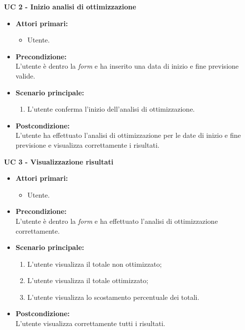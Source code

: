 \vspace{0.5cm}

\noindent \textbf{\large UC 2 - Inizio analisi di ottimizzazione}
\label{uc:inizio-analisi-ottimizzazione}
\begin{itemize}

	\item \textbf{Attori primari: }
		\begin{itemize}
			\item Utente.
		\end{itemize}

	\item \textbf{Precondizione: }\\[0.3cm]
		L'utente è dentro la \textit{form} e ha inserito una data di inizio e fine previsione valide.

	\item \textbf{Scenario principale: }
		\begin{enumerate}
			\item L'utente conferma l'inizio dell'analisi di ottimizzazione.
		\end{enumerate}
		

	\item \textbf{Postcondizione: }\\[0.3cm]
		L'utente ha effettuato l'analisi di ottimizzazione per le date di inizio e fine previsione e visualizza correttamente i risultati.

\end{itemize}

\vspace{0.5cm}

\noindent \textbf{\large UC 3 - Visualizzazione risultati}
\label{uc:visualizzazione-risultati}
\begin{itemize}

	\item \textbf{Attori primari: }
		\begin{itemize}
			\item Utente.
		\end{itemize}

	\item \textbf{Precondizione: }\\[0.3cm]
		L'utente è dentro la \textit{form} e ha effettuato l'analisi di ottimizzazione correttamente.

	\item \textbf{Scenario principale: }
		\begin{enumerate}
			\item L'utente visualizza il totale non ottimizzato;
			\item L'utente visualizza il totale ottimizzato;
			\item L'utente visualizza lo scostamento percentuale dei totali.
		\end{enumerate}
		

	\item \textbf{Postcondizione: }\\[0.3cm]
		L'utente visualizza correttamente tutti i risultati.

\end{itemize}

